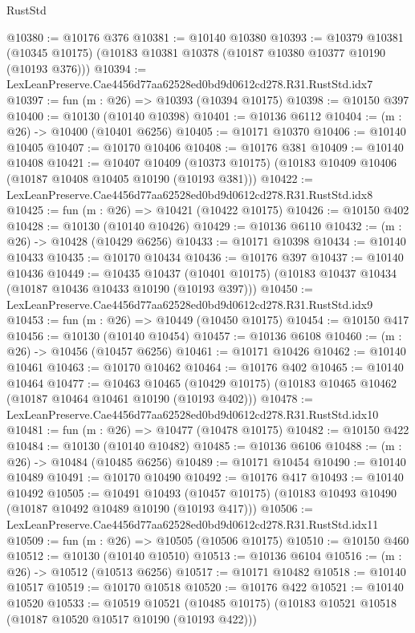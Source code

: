 \begin{lexlean}{RustStd}
\begin{coremodule}
@10380 := @10176 @376
@10381 := @10140 @10380
@10393 := @10379
    @10381
    (@10345 @10175)
    (@10183 @10381 @10378 (@10187 @10380 @10377 @10190 (@10193 @376)))
@10394 := LexLeanPreserve.Cae4456d77aa62528ed0bd9d0612cd278.R31.RustStd.idx7
@10397 := fun (m : @26) => @10393 (@10394 @10175)
@10398 := @10150 @397
@10400 := @10130 (@10140 @10398)
@10401 := @10136 @6112
@10404 := (m : @26) -> @10400 (@10401 @6256)
@10405 := @10171 @10370
@10406 := @10140 @10405
@10407 := @10170 @10406
@10408 := @10176 @381
@10409 := @10140 @10408
@10421 := @10407
    @10409
    (@10373 @10175)
    (@10183 @10409 @10406 (@10187 @10408 @10405 @10190 (@10193 @381)))
@10422 := LexLeanPreserve.Cae4456d77aa62528ed0bd9d0612cd278.R31.RustStd.idx8
@10425 := fun (m : @26) => @10421 (@10422 @10175)
@10426 := @10150 @402
@10428 := @10130 (@10140 @10426)
@10429 := @10136 @6110
@10432 := (m : @26) -> @10428 (@10429 @6256)
@10433 := @10171 @10398
@10434 := @10140 @10433
@10435 := @10170 @10434
@10436 := @10176 @397
@10437 := @10140 @10436
@10449 := @10435
    @10437
    (@10401 @10175)
    (@10183 @10437 @10434 (@10187 @10436 @10433 @10190 (@10193 @397)))
@10450 := LexLeanPreserve.Cae4456d77aa62528ed0bd9d0612cd278.R31.RustStd.idx9
@10453 := fun (m : @26) => @10449 (@10450 @10175)
@10454 := @10150 @417
@10456 := @10130 (@10140 @10454)
@10457 := @10136 @6108
@10460 := (m : @26) -> @10456 (@10457 @6256)
@10461 := @10171 @10426
@10462 := @10140 @10461
@10463 := @10170 @10462
@10464 := @10176 @402
@10465 := @10140 @10464
@10477 := @10463
    @10465
    (@10429 @10175)
    (@10183 @10465 @10462 (@10187 @10464 @10461 @10190 (@10193 @402)))
@10478 := LexLeanPreserve.Cae4456d77aa62528ed0bd9d0612cd278.R31.RustStd.idx10
@10481 := fun (m : @26) => @10477 (@10478 @10175)
@10482 := @10150 @422
@10484 := @10130 (@10140 @10482)
@10485 := @10136 @6106
@10488 := (m : @26) -> @10484 (@10485 @6256)
@10489 := @10171 @10454
@10490 := @10140 @10489
@10491 := @10170 @10490
@10492 := @10176 @417
@10493 := @10140 @10492
@10505 := @10491
    @10493
    (@10457 @10175)
    (@10183 @10493 @10490 (@10187 @10492 @10489 @10190 (@10193 @417)))
@10506 := LexLeanPreserve.Cae4456d77aa62528ed0bd9d0612cd278.R31.RustStd.idx11
@10509 := fun (m : @26) => @10505 (@10506 @10175)
@10510 := @10150 @460
@10512 := @10130 (@10140 @10510)
@10513 := @10136 @6104
@10516 := (m : @26) -> @10512 (@10513 @6256)
@10517 := @10171 @10482
@10518 := @10140 @10517
@10519 := @10170 @10518
@10520 := @10176 @422
@10521 := @10140 @10520
@10533 := @10519
    @10521
    (@10485 @10175)
    (@10183 @10521 @10518 (@10187 @10520 @10517 @10190 (@10193 @422)))

\end{coremodule}
\end{lexlean}
